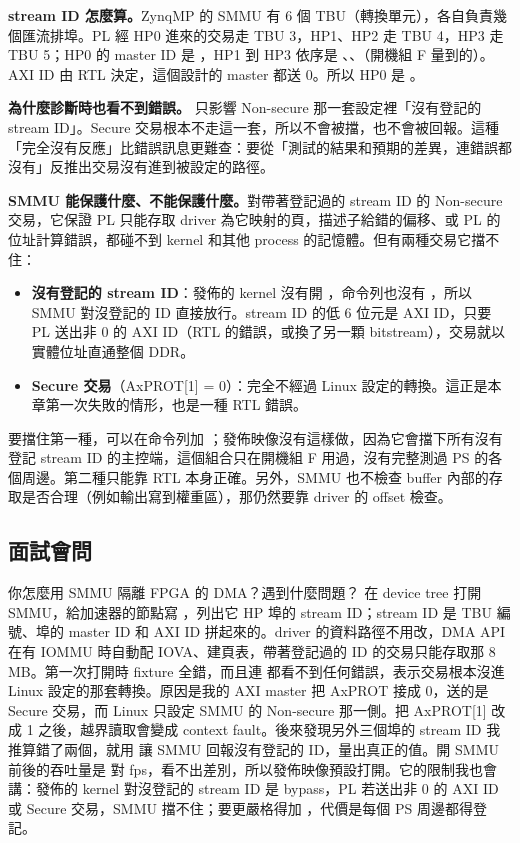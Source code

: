 \textbf{stream ID 怎麼算。}ZynqMP 的 SMMU 有 6 個 TBU（轉換單元），各自負責幾個匯流排埠。PL 經 HP0 進來的交易走 TBU 3，HP1、HP2 走 TBU 4，HP3 走 TBU 5；HP0 的 master ID 是 ，HP1 到 HP3 依序是 、、（開機組 F 量到的）。AXI ID 由 RTL 決定，這個設計的 master 都送 0。所以 HP0 是 。

\textbf{為什麼診斷時也看不到錯誤。} 只影響 Non-secure 那一套設定裡「沒有登記的 stream ID」。Secure 交易根本不走這一套，所以不會被擋，也不會被回報。這種「完全沒有反應」比錯誤訊息更難查：要從「測試的結果和預期的差異，連錯誤都沒有」反推出交易沒有進到被設定的路徑。

\textbf{SMMU 能保護什麼、不能保護什麼。}對帶著登記過的 stream ID 的 Non-secure 交易，它保證 PL 只能存取 driver 為它映射的頁，描述子給錯的偏移、或 PL 的位址計算錯誤，都碰不到 kernel 和其他 process 的記憶體。但有兩種交易它擋不住：
\begin{itemize}
\item \textbf{沒有登記的 stream ID}：發佈的 kernel 沒有開 ，命令列也沒有 ，所以 SMMU 對沒登記的 ID 直接放行。stream ID 的低 6 位元是 AXI ID，只要 PL 送出非 0 的 AXI ID（RTL 的錯誤，或換了另一顆 bitstream），交易就以實體位址直通整個 DDR。
\item \textbf{Secure 交易}（AxPROT[1] = 0）：完全不經過 Linux 設定的轉換。這正是本章第一次失敗的情形，也是一種 RTL 錯誤。
\end{itemize}
要擋住第一種，可以在命令列加 ；發佈映像沒有這樣做，因為它會擋下所有沒有登記 stream ID 的主控端，這個組合只在開機組 F 用過，沒有完整測過 PS 的各個周邊。第二種只能靠 RTL 本身正確。另外，SMMU 也不檢查 buffer 內部的存取是否合理（例如輸出寫到權重區），那仍然要靠 driver 的 offset 檢查。

\subsection{面試會問}

\begin{qa}{你怎麼用 SMMU 隔離 FPGA 的 DMA？遇到什麼問題？}
在 device tree 打開 SMMU，給加速器的節點寫 ，列出它 HP 埠的 stream ID；stream ID 是 TBU 編號、埠的 master ID 和 AXI ID 拼起來的。driver 的資料路徑不用改，DMA API 在有 IOMMU 時自動配 IOVA、建頁表，帶著登記過的 ID 的交易只能存取那 8 MB。第一次打開時 fixture 全錯，而且連  都看不到任何錯誤，表示交易根本沒進 Linux 設定的那套轉換。原因是我的 AXI master 把 AxPROT 接成 0，送的是 Secure 交易，而 Linux 只設定 SMMU 的 Non-secure 那一側。把 AxPROT[1] 改成 1 之後，越界讀取會變成 context fault。後來發現另外三個埠的 stream ID 我推算錯了兩個，就用  讓 SMMU 回報沒有登記的 ID，量出真正的值。開 SMMU 前後的吞吐量是 \smmuOnFps{} 對 \smmuOffFps{} fps，看不出差別，所以發佈映像預設打開。它的限制我也會講：發佈的 kernel 對沒登記的 stream ID 是 bypass，PL 若送出非 0 的 AXI ID 或 Secure 交易，SMMU 擋不住；要更嚴格得加 ，代價是每個 PS 周邊都得登記。
\end{qa}

